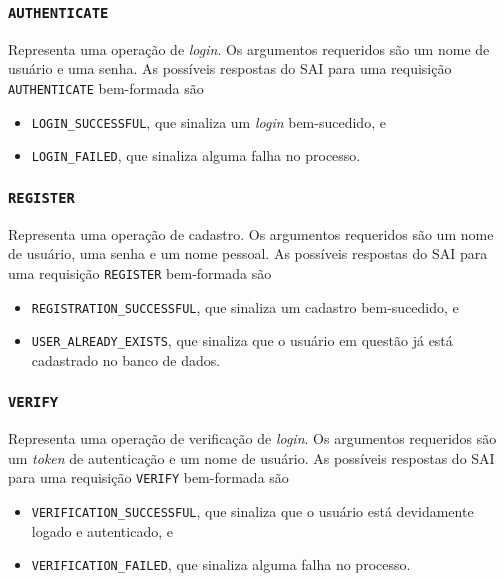 \documentclass{article}
\begin{document}
\begin{multicols}{2}
    \subsubsection{\texttt{AUTHENTICATE}}
    
    Representa uma operação de \textit{login}. Os argumentos requeridos são um nome de usuário e uma senha. As possíveis respostas do SAI para uma requisição \texttt{AUTHENTICATE} bem-formada são
    
    \begin{itemize}
      \item \texttt{LOGIN\_SUCCESSFUL}, que sinaliza um \textit{login} bem-sucedido, e
      \item \texttt{LOGIN\_FAILED}, que sinaliza alguma falha no processo.
    \end{itemize}
    
    \subsubsection{\texttt{REGISTER}}
    
    Representa uma operação de cadastro. Os argumentos requeridos são um nome de usuário, uma senha e um nome pessoal. As possíveis respostas do SAI para uma requisição \texttt{REGISTER} bem-formada são
    
    \begin{itemize}
      \item \texttt{REGISTRATION\_SUCCESSFUL}, que sinaliza um cadastro bem-sucedido, e
      \item \texttt{USER\_ALREADY\_EXISTS}, que sinaliza que o usuário em questão já está cadastrado no banco de dados.
    \end{itemize}
    
    \subsubsection{\texttt{VERIFY}}
    
    Representa uma operação de verificação de \textit{login}. Os argumentos requeridos são um \textit{token} de autenticação e um nome de usuário. As possíveis respostas do SAI para uma requisição \texttt{VERIFY} bem-formada são
    
    \begin{itemize}
      \item \texttt{VERIFICATION\_SUCCESSFUL}, que sinaliza que o usuário está devidamente logado e autenticado, e
      \item \texttt{VERIFICATION\_FAILED}, que sinaliza alguma falha no processo.
    \end{itemize}
    

\end{multicols}
\end{document}

